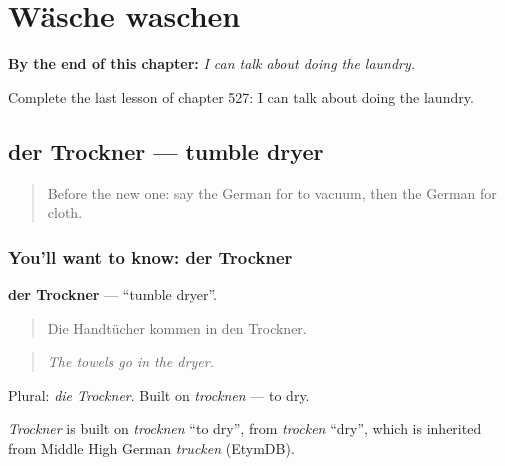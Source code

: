 
\chapter{Wäsche waschen}
\label{ch:ge-wasche-waschen}

\begin{chapteropening}
\textbf{By the end of this chapter:} \emph{I can talk about doing the laundry.}

Complete the last lesson of chapter 527: I can talk about doing the laundry.
\end{chapteropening}

\section[der Trockner]{der Trockner — tumble dryer}

\label{lesson:GE-C527-trockner}



\begin{quote}
Before the new one: say the German for to vacuum, then the German for cloth.
\end{quote}

\subsection*{You'll want to know: der Trockner}
\textbf{der Trockner} — \textquotedblleft{}tumble dryer\textquotedblright{}.

\begin{quote}
Die Handtücher kommen in den Trockner.
\end{quote}

\begin{quote}
\emph{The towels go in the dryer.}
\end{quote}

Plural: \emph{die Trockner}. Built on \emph{trocknen} — to dry.

\begin{cousinweb}
\emph{Trockner} is built on \emph{trocknen} \textquotedblleft{}to dry\textquotedblright{}, from \emph{trocken} \textquotedblleft{}dry\textquotedblright{}, which is inherited from Middle High German \emph{trucken} (EtymDB).
\end{cousinweb}

